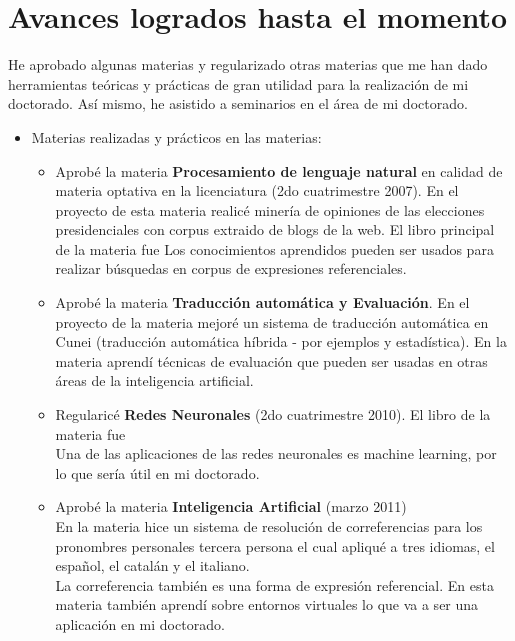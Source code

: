 \section{Avances logrados hasta el momento}
\label{progreso}

He aprobado algunas materias y regularizado otras materias que me han dado herramientas te\'oricas y pr\'acticas de gran utilidad para la realizaci\'on de mi doctorado. As\'i mismo, he asistido a seminarios en el \'area de mi doctorado.

\begin{itemize}

\item Materias realizadas y pr\'acticos en las materias:\\

\begin{itemize}
\item Aprob\'e la materia {\bf Procesamiento de lenguaje natural} en calidad de materia optativa en la licenciatura (2do cuatrimestre 2007). En el proyecto de esta materia realic\'e miner\'ia de opiniones de las elecciones presidenciales con corpus extraido de blogs de la web. El libro principal de la materia fue \cite{Manning2000}
Los conocimientos aprendidos pueden ser usados para realizar b\'usquedas en corpus de expresiones referenciales.
\item Aprob\'e la materia {\bf Traducci\'on autom\'atica y Evaluaci\'on}. En el proyecto de la materia mejor\'e un sistema de traducci\'on autom\'atica en Cunei (traducci\'on autom\'atica h\'ibrida - por ejemplos y estad\'istica).
En la materia aprend\'i t\'ecnicas de evaluaci\'on que pueden ser usadas en otras \'areas de la inteligencia artificial. 
\item Regularic\'e {\bf Redes Neuronales} (2do cuatrimestre 2010). El libro de la materia fue \cite{Hertz1991}\\
Una de las aplicaciones de las redes neuronales es machine learning, por lo que ser\'ia \'util en mi doctorado.
\item Aprob\'e la materia {\bf Inteligencia Artificial} (marzo 2011)\\
En la materia hice un sistema de resoluci\'on de correferencias para los pronombres personales tercera persona el cual apliqu\'e a tres idiomas, el espa\~{n}ol, el catal\'an y el italiano.\\
La correferencia tambi\'en es una forma de expresi\'on referencial. En esta materia tambi\'en aprend\'i sobre entornos virtuales lo que va a ser una aplicaci\'on en mi doctorado.

\end{itemize}
\end{itemize}
